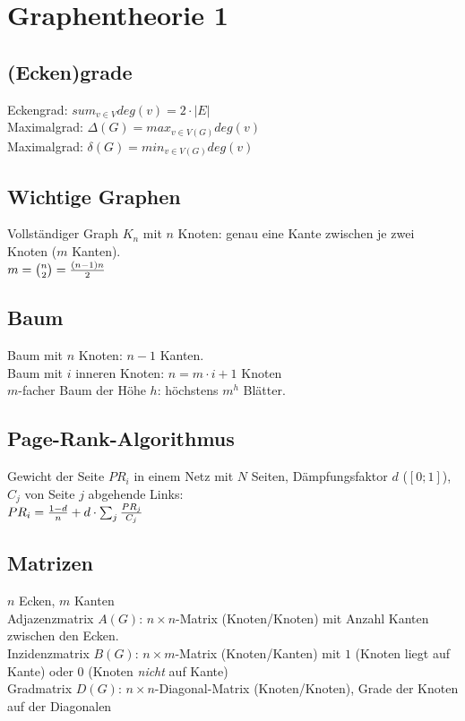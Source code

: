 \section{Graphentheorie 1}

\subsection{(Ecken)grade}

Eckengrad: $ sum_{v \in V} deg(v) = 2 \cdot |E| $
\\
Maximalgrad: $ \Delta(G) = max_{v \in V(G)} {deg}(v) $
\\
Maximalgrad: $ \delta(G) = min_{v \in V(G)} {deg}(v) $

\subsection{Wichtige Graphen}

Vollständiger Graph $K_n$ mit $n$ Knoten: genau eine Kante zwischen je zwei Knoten ($m$ Kanten).
\\
$ m = {{n}\choose{2}} = {{(n-1)n}\over{2}} $ 

\subsection{Baum}

Baum mit $n$ Knoten: $n-1$ Kanten.
\\
Baum mit $i$ inneren Knoten: $n=m \cdot i + 1$ Knoten
\\
$m$-facher Baum der Höhe $h$: höchstens $m^h$ Blätter.

\subsection{Page-Rank-Algorithmus}

Gewicht der Seite $PR_i$ in einem Netz mit $N$ Seiten, Dämpfungsfaktor $d$ ($[0;1]$), $C_j$ von Seite $j$ abgehende Links:
\\
$PR_i = {{1-d}\over{n}} + d \cdot \sum_{j} {{PR_j}\over{C_j}}$

\subsection{Matrizen}

$n$ Ecken, $m$ Kanten
\\
Adjazenzmatrix $A(G)$: $n \times n$-Matrix (Knoten/Knoten) mit Anzahl Kanten zwischen den Ecken.
\\
Inzidenzmatrix $B(G)$: $n \times m$-Matrix (Knoten/Kanten) mit $1$ (Knoten liegt auf Kante) oder $0$ (Knoten \textit{nicht} auf Kante)
\\
Gradmatrix $D(G)$: $n \times n$-Diagonal-Matrix (Knoten/Knoten), Grade der Knoten auf der Diagonalen

